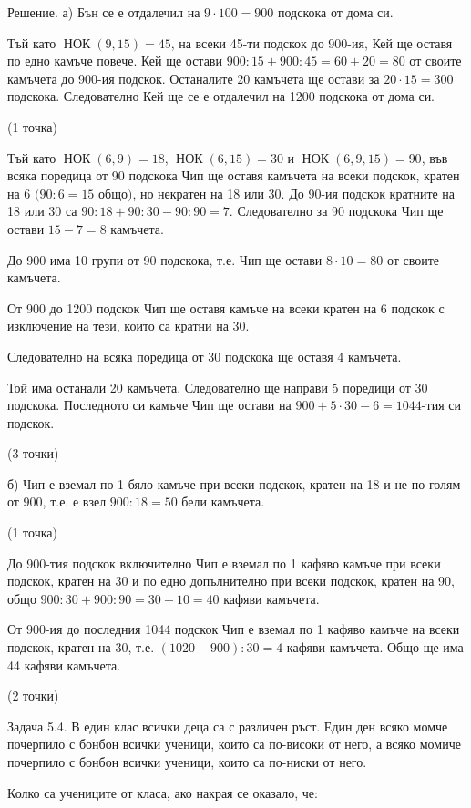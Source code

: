 Решение. а) Бън се е отдалечил на $9\cdot100=900$ подскока от дома си.

Тъй като $\operatorname{НОК}(9,15)=45$, на всеки 45-ти подскок до 900-ия, Кей ще оставя по едно камъче повече. Кей ще остави $900:15+900:45=60+20=80$ от своите камъчета до 900-ия подскок. Останалите 20 камъчета ще остави за $20\cdot15=300$ подскока. Следователно Кей ще се е отдалечил на 1200 подскока от дома си.

(1 точка)

Тъй като $\operatorname{НОК}(6,9)=18$, $\operatorname{НОК}(6,15)=30$ и $\operatorname{НОК}(6,9,15)=90$, във всяка поредица от 90 подскока Чип ще оставя камъчета на всеки подскок, кратен на 6 $(90:6=15$ общо$)$, но некратен на 18 или 30. До 90-ия подскок кратните на 18 или 30 са $90:18+90:30-90:90=7$. Следователно за 90 подскока Чип ще остави $15-7=8$ камъчета.

До 900 има 10 групи от 90 подскока, т.е. Чип ще остави $8\cdot10=80$ от своите камъчета.

От 900 до 1200 подскок Чип ще оставя камъче на всеки кратен на 6 подскок с изключение на тези, които са кратни на 30.

Следователно на всяка поредица от 30 подскока ще оставя 4 камъчета.

Той има останали 20 камъчета. Следователно ще направи 5 поредици от 30 подскока. Последното си камъче Чип ще остави на $900+5\cdot30-6=1044$-тия си подскок.

(3 точки)

б) Чип е вземал по 1 бяло камъче при всеки подскок, кратен на 18 и не по-голям от 900, т.е. е взел $900:18=50$ бели камъчета.

(1 точка)

До 900-тия подскок включително Чип е вземал по 1 кафяво камъче при всеки подскок, кратен на 30 и по едно допълнително при всеки подскок, кратен на 90, общо $900:30+900:90=30+10=40$ кафяви камъчета.

От 900-ия до последния 1044 подскок Чип е вземал по 1 кафяво камъче на всеки подскок, кратен на 30, т.е. $(1020-900):30=4$ кафяви камъчета. Общо ще има 44 кафяви камъчета.

(2 точки)

Задача 5.4. В един клас всички деца са с различен ръст. Един ден всяко момче почерпило с бонбон всички ученици, които са по-високи от него, а всяко момиче почерпило с бонбон всички ученици, които са по-ниски от него.

Колко са учениците от класа, ако накрая се оказало, че:

